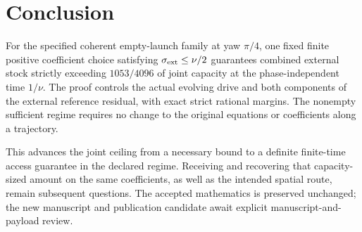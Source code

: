 \section{Conclusion}\label{sec:conclusion}
For the specified coherent empty-launch family at yaw $\pi/4$, one fixed finite positive coefficient choice satisfying $\sigma_{\rm ext}\le\nu/2$ guarantees combined external stock strictly exceeding $1053/4096$ of joint capacity at the phase-independent time $1/\nu$. The proof controls the actual evolving drive and both components of the external reference residual, with exact strict rational margins. The nonempty sufficient regime requires no change to the original equations or coefficients along a trajectory.

This advances the joint ceiling from a necessary bound to a definite finite-time access guarantee in the declared regime. Receiving and recovering that capacity-sized amount on the same coefficients, as well as the intended spatial route, remain subsequent questions. The accepted mathematics is preserved unchanged; the new manuscript and publication candidate await explicit manuscript-and-payload review.

